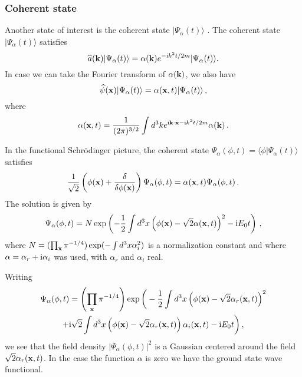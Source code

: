 \documentclass[12pt]{article}
\def\la{\langle}
\def\ra{\rangle}
\def\ii{\textrm i}
\begin{document}
\subsubsection{Coherent state}
Another state of interest is the coherent state $|\Psi_\alpha(t) \ra$ \cite{glauber63}. The coherent state $|\Psi_\alpha(t)\ra$ satisfies 
\begin{equation}
{\widehat a}({\bf k}) |\Psi_\alpha (t)\ra = \alpha({\bf k})e^{-\ii k^2t/2m}|\Psi_\alpha(t) \ra.
\label{s.23}
\end{equation}
In case we can take the Fourier transform of $\alpha({\bf k})$, we also have 
\begin{equation}
{\widehat \psi} ({\bf x}) |\Psi_\alpha (t)\ra = \alpha({\bf x},t) |\Psi_\alpha (t)\ra\,,
\label{s.24}
\end{equation}
where
\begin{equation}
\alpha({\bf x},t) = \frac{1}{(2\pi)^{3/2}}  \int d^3 k  e^{\ii {\bf k} \cdot {\bf x}-\ii k^2t/2m} \alpha({\bf k})\,.
\label{s.25}
\end{equation}

In the functional Schr{\"o}\-ding\-er picture, the coherent state $\Psi_\alpha(\phi,t)=\la \phi |\Psi_\alpha(t)\ra$ satisfies
\begin{equation}
\frac{1}{\sqrt{2}}\left( \phi({\bf x}) + \frac{\delta }{\delta \phi({\bf x})} \right) \Psi_\alpha(\phi,t) = \alpha({\bf x},t) \Psi_\alpha(\phi,t) \,.
\label{s.26}
\end{equation}
The solution is given by
\begin{equation}
\Psi_\alpha(\phi,t) =N \exp \left( -\frac{1}{2} \int d^3 x \left(\phi({\bf x}) -\sqrt{2} \alpha({\bf x},t)  \right)^2 -\ii E_0t\right)\,,
\label{s.27}
\end{equation}
where $N=(\prod_{\bf x} \pi^{-1/4})\exp(- \int  d^3 x \alpha_i^2)$ is a normalization constant and where $\alpha = \alpha_r + \ii \alpha_i$ was used, with $\alpha_r$ and $\alpha_i$ real.

Writing 
\begin{multline}
\Psi_\alpha(\phi,t) = \left(\prod_{\bf x}  \pi^{-1/4} \right)  \exp \bigg(  -\frac{1}{2} \int d^3 x \left(\phi({\bf x}) -\sqrt{2} \alpha_r({\bf x},t)  \right)^2    \\
 + \ii \sqrt{2}  \int d^3 x \left(\phi({\bf x}) - \sqrt{2} \alpha_r({\bf x},t) \right)\alpha_i({\bf x},t)    -\ii E_0t \bigg)\,,
\label{s.28}
\end{multline}
we see that the field density $|\Psi_\alpha(\phi,t)|^2$ is a Gaussian centered around the field $\sqrt{2} \alpha_r({\bf x},t)$. In the case the function $\alpha$ is zero we have the ground state wave functional. 
\end{document}
